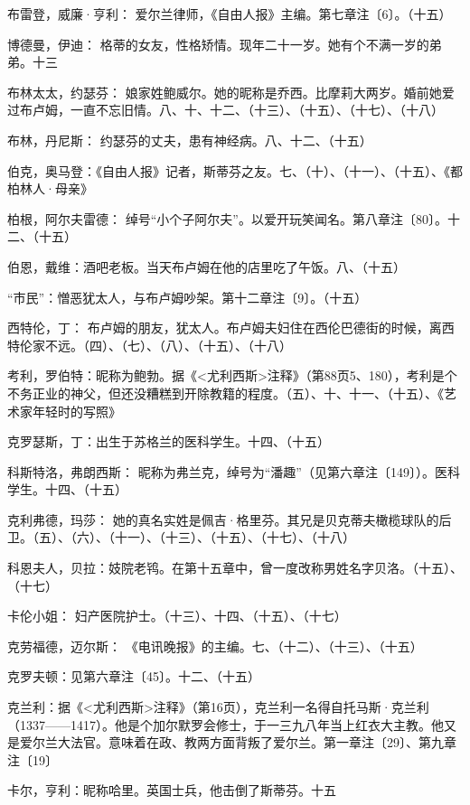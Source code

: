 \par 布雷登，威廉·亨利： 爱尔兰律师，《自由人报》主编。第七章注〔6〕。（十五）
\par 博德曼，伊迪： 格蒂的女友，性格矫情。现年二十一岁。她有个不满一岁的弟弟。十三
\par 布林太太，约瑟芬： 娘家姓鲍威尔。她的昵称是乔西。比摩莉大两岁。婚前她爱过布卢姆，一直不忘旧情。八、十、十二、（十三）、（十五）、（十七）、（十八）
\par 布林，丹尼斯： 约瑟芬的丈夫，患有神经病。八、十二、（十五）
\par 伯克，奥马登：《自由人报》记者，斯蒂芬之友。七、（十）、（十一）、（十五）、《都柏林人·母亲》
\par 柏根，阿尔夫雷德： 绰号“小个子阿尔夫”。以爱开玩笑闻名。第八章注〔80〕。十二、（十五）
\par 伯恩，戴维：酒吧老板。当天布卢姆在他的店里吃了午饭。八、（十五）
\par “市民”：憎恶犹太人，与布卢姆吵架。第十二章注〔9〕。（十五）
\par 西特伦，丁： 布卢姆的朋友，犹太人。布卢姆夫妇住在西伦巴德街的时候，离西特伦家不远。（四）、（七）、（八）、（十五）、（十八）
\par 考利，罗伯特：昵称为鲍勃。据《<尤利西斯>注释》（第88页5、180），考利是个不务正业的神父，但还没糟糕到开除教籍的程度。（五）、十、十一、（十五）、《艺术家年轻时的写照》
\par 克罗瑟斯，丁：出生于苏格兰的医科学生。十四、（十五）
\par 科斯特洛，弗朗西斯： 昵称为弗兰克，绰号为“潘趣”（见第六章注〔149〕）。医科学生。十四、（十五）
\par 克利弗德，玛莎： 她的真名实姓是佩吉·格里芬。其兄是贝克蒂夫橄榄球队的后卫。（五）、（六）、（十一）、（十三）、（十五）、（十七）、（十八）
\par 科恩夫人，贝拉：妓院老鸨。在第十五章中，曾一度改称男姓名字贝洛。（十五）、（十七）
\par 卡伦小姐： 妇产医院护士。（十三）、十四、（十五）、（十七）
\par 克劳福德，迈尔斯： 《电讯晚报》的主编。七、（十二）、（十三）、（十五）
\par 克罗夫顿：见第六章注〔45〕。十二、（十五）
\par 克兰利：据《<尤利西斯>注释》（第16页），克兰利一名得自托马斯·克兰利（1337——1417）。他是个加尔默罗会修士，于一三九八年当上红衣大主教。他又是爱尔兰大法官。意味着在政、教两方面背叛了爱尔兰。第一章注〔29〕、第九章注〔19〕
\par 卡尔，亨利：昵称哈里。英国士兵，他击倒了斯蒂芬。十五
